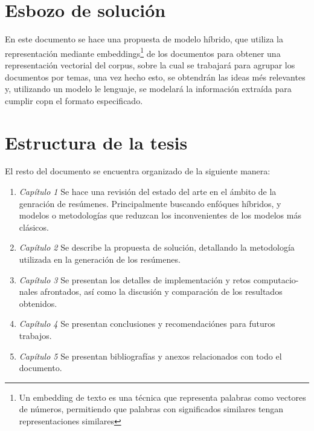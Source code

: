 \section{Esbozo de solución}
    En este documento se hace una propuesta de modelo híbrido, que utiliza la representación mediante embeddings\footnote{Un embedding de texto es una técnica que representa palabras como vectores de números, permitiendo que palabras con significados similares tengan representaciones similares}
    de los documentos para obtener una representación vectorial del corpus, sobre la cual se trabajará para agrupar los documentos por temas, una vez hecho esto, se obtendrán las ideas més relevantes y, utilizando un modelo le lenguaje, se modelará la información extraída para cumplir copn el formato especificado.
\section{Estructura de la tesis}
        El resto del documento se encuentra organizado de la siguiente manera:

        \begin{enumerate}
            \item \emph{Capítulo 1} Se hace una revisión del estado del arte en el ámbito de la genración de resúmenes. Principalmente buscando enfóques híbridos, y modelos o metodologías que reduzcan los inconvenientes de los modelos más clásicos.
            \item \emph{Capítulo 2} Se describe la propuesta de solución, detallando la metodología utilizada en la generación de los resúmenes.
            \item \emph{Capítulo 3} Se presentan los detalles de implementación y retos computacio-
            nales afrontados, así como la discusión y comparación de los resultados obtenidos.
            \item \emph{Capítulo 4} Se presentan conclusiones y recomendaciónes para futuros trabajos.
            \item \emph{Capítulo 5} Se presentan bibliografías y anexos relacionados con todo el documento.
        \end{enumerate}


